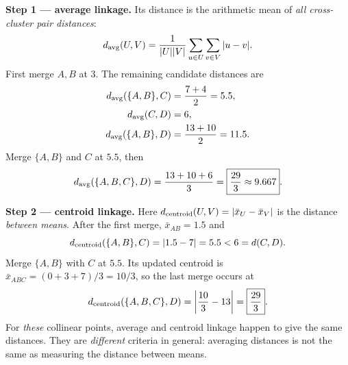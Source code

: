 \textbf{Step 1 --- average linkage.} Its distance is the arithmetic mean of \emph{all cross-cluster pair distances}:
\[
d_{\rm avg}(U,V)=\frac{1}{|U||V|}\sum_{u\in U}\sum_{v\in V}|u-v|.
\]
First merge $A,B$ at $3$. The remaining candidate distances are
\[
\begin{aligned}
d_{\rm avg}(\{A,B\},C)&=\frac{7+4}{2}=5.5,\\
d_{\rm avg}(C,D)&=6,\\
d_{\rm avg}(\{A,B\},D)&=\frac{13+10}{2}=11.5.
\end{aligned}
\]
Merge $\{A,B\}$ and $C$ at $5.5$, then
\[
d_{\rm avg}(\{A,B,C\},D)=\frac{13+10+6}{3}=\boxed{\frac{29}{3}\approx9.667}.
\]

\textbf{Step 2 --- centroid linkage.} Here $d_{\rm centroid}(U,V)=|\bar x_U-\bar x_V|$ is the distance \emph{between means}. After the first merge, $\bar x_{AB}=1.5$ and
\[
d_{\rm centroid}(\{A,B\},C)=|1.5-7|=5.5<6=d(C,D).
\]
Merge $\{A,B\}$ with $C$ at $5.5$. Its updated centroid is $\bar x_{ABC}=(0+3+7)/3=10/3$, so the last merge occurs at
\[
d_{\rm centroid}(\{A,B,C\},D)=\left|\frac{10}{3}-13\right|=\boxed{\frac{29}{3}}.
\]
For \emph{these} collinear points, average and centroid linkage happen to give the same distances. They are \emph{different} criteria in general: averaging distances is not the same as measuring the distance between means.

